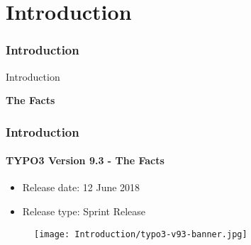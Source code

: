 %

\section{Introduction}
\begin{frame}[fragile]
	\frametitle{Introduction}

	\begin{center}\huge{Introduction}\end{center}
	\begin{center}\huge{\color{typo3darkgrey}\textbf{The Facts}}\end{center}

\end{frame}

\begin{frame}[fragile]
	\frametitle{Introduction}
	\framesubtitle{TYPO3 Version 9.3 - The Facts}

	\begin{itemize}
		\item Release date: 12 June 2018
		\item Release type: Sprint Release
	\end{itemize}

	\begin{figure}
		\texttt{[image: Introduction/typo3-v93-banner.jpg]}
	\end{figure}

\end{frame}


